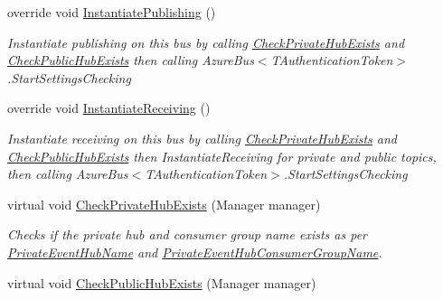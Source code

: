 \begin{DoxyCompactItemize}
override void \hyperlink{classCqrs_1_1Azure_1_1ServiceBus_1_1AzureEventHub_a3747fb9fcb3de2a72c8a6d7bbd92db95_a3747fb9fcb3de2a72c8a6d7bbd92db95}{Instantiate\+Publishing} ()
\begin{DoxyCompactList}\small\item\em Instantiate publishing on this bus by calling \hyperlink{classCqrs_1_1Azure_1_1ServiceBus_1_1AzureEventHub_a2da39ab1b2bc5fe995b6bd1fea461852_a2da39ab1b2bc5fe995b6bd1fea461852}{Check\+Private\+Hub\+Exists} and \hyperlink{classCqrs_1_1Azure_1_1ServiceBus_1_1AzureEventHub_aee7b4360172cf49fb2e885a3a525aa66_aee7b4360172cf49fb2e885a3a525aa66}{Check\+Public\+Hub\+Exists} then calling Azure\+Bus$<$\+T\+Authentication\+Token$>$.\+Start\+Settings\+Checking \end{DoxyCompactList}\item 
override void \hyperlink{classCqrs_1_1Azure_1_1ServiceBus_1_1AzureEventHub_aa725781eddb65bdfe456a4fecb36fb6b_aa725781eddb65bdfe456a4fecb36fb6b}{Instantiate\+Receiving} ()
\begin{DoxyCompactList}\small\item\em Instantiate receiving on this bus by calling \hyperlink{classCqrs_1_1Azure_1_1ServiceBus_1_1AzureEventHub_a2da39ab1b2bc5fe995b6bd1fea461852_a2da39ab1b2bc5fe995b6bd1fea461852}{Check\+Private\+Hub\+Exists} and \hyperlink{classCqrs_1_1Azure_1_1ServiceBus_1_1AzureEventHub_aee7b4360172cf49fb2e885a3a525aa66_aee7b4360172cf49fb2e885a3a525aa66}{Check\+Public\+Hub\+Exists} then Instantiate\+Receiving for private and public topics, then calling Azure\+Bus$<$\+T\+Authentication\+Token$>$.\+Start\+Settings\+Checking \end{DoxyCompactList}\item 
virtual void \hyperlink{classCqrs_1_1Azure_1_1ServiceBus_1_1AzureEventHub_a2da39ab1b2bc5fe995b6bd1fea461852_a2da39ab1b2bc5fe995b6bd1fea461852}{Check\+Private\+Hub\+Exists} (Manager manager)
\begin{DoxyCompactList}\small\item\em Checks if the private hub and consumer group name exists as per \hyperlink{classCqrs_1_1Azure_1_1ServiceBus_1_1AzureEventHub_ac6802047e00a92ea4b0ae6b69ef7310a_ac6802047e00a92ea4b0ae6b69ef7310a}{Private\+Event\+Hub\+Name} and \hyperlink{classCqrs_1_1Azure_1_1ServiceBus_1_1AzureEventHub_a0c091d0cb19dda3e8bfc20f0e7d30af3_a0c091d0cb19dda3e8bfc20f0e7d30af3}{Private\+Event\+Hub\+Consumer\+Group\+Name}. \end{DoxyCompactList}\item 
virtual void \hyperlink{classCqrs_1_1Azure_1_1ServiceBus_1_1AzureEventHub_aee7b4360172cf49fb2e885a3a525aa66_aee7b4360172cf49fb2e885a3a525aa66}{Check\+Public\+Hub\+Exists} (Manager manager)

\end{DoxyCompactItemize}
